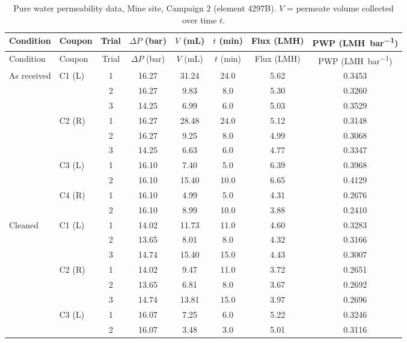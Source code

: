 {\footnotesize\setlength{\tabcolsep}{4pt}
\begin{longtable}{llcccccc}
  \caption{Pure water permeability data, Mine site, Campaign 2 (element 4297B). $V$ = permeate volume collected over time $t$.}
  \label{tab:app-c2-mine-pwp}\\
  \toprule
  Condition & Coupon & Trial & $\Delta P$ (\unit{bar}) & $V$ (\unit{mL}) & $t$ (\unit{min}) & Flux (\unit{LMH}) & PWP (\unit{LMH.bar^{-1}}) \\
  \midrule
  \endfirsthead
  \toprule
  Condition & Coupon & Trial & $\Delta P$ (\unit{bar}) & $V$ (\unit{mL}) & $t$ (\unit{min}) & Flux (\unit{LMH}) & PWP (\unit{LMH.bar^{-1}}) \\
  \midrule
  \endhead
    As received & C1 (L) & 1 & 16.27 & 31.24 & 24.0 & 5.62 & 0.3453 \\
     &  & 2 & 16.27 & 9.83 & 8.0 & 5.30 & 0.3260 \\
     &  & 3 & 14.25 & 6.99 & 6.0 & 5.03 & 0.3529 \\
    \addlinespace[2pt]
     & C2 (R) & 1 & 16.27 & 28.48 & 24.0 & 5.12 & 0.3148 \\
     &  & 2 & 16.27 & 9.25 & 8.0 & 4.99 & 0.3068 \\
     &  & 3 & 14.25 & 6.63 & 6.0 & 4.77 & 0.3347 \\
    \addlinespace[2pt]
     & C3 (L) & 1 & 16.10 & 7.40 & 5.0 & 6.39 & 0.3968 \\
     &  & 2 & 16.10 & 15.40 & 10.0 & 6.65 & 0.4129 \\
    \addlinespace[2pt]
     & C4 (R) & 1 & 16.10 & 4.99 & 5.0 & 4.31 & 0.2676 \\
     &  & 2 & 16.10 & 8.99 & 10.0 & 3.88 & 0.2410 \\
    \midrule
    Cleaned & C1 (L) & 1 & 14.02 & 11.73 & 11.0 & 4.60 & 0.3283 \\
     &  & 2 & 13.65 & 8.01 & 8.0 & 4.32 & 0.3166 \\
     &  & 3 & 14.74 & 15.40 & 15.0 & 4.43 & 0.3007 \\
    \addlinespace[2pt]
     & C2 (R) & 1 & 14.02 & 9.47 & 11.0 & 3.72 & 0.2651 \\
     &  & 2 & 13.65 & 6.81 & 8.0 & 3.67 & 0.2692 \\
     &  & 3 & 14.74 & 13.81 & 15.0 & 3.97 & 0.2696 \\
    \addlinespace[2pt]
     & C3 (L) & 1 & 16.07 & 7.25 & 6.0 & 5.22 & 0.3246 \\
     &  & 2 & 16.07 & 3.48 & 3.0 & 5.01 & 0.3116 \\

\end{longtable}}

